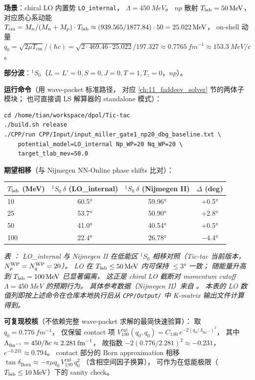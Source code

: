 \begin{numericalbox}
\textbf{场景}：chiral LO 内置势 \texttt{LO\_internal}，
$\Lambda = \SI{450}{MeV}$。
$np$ 散射 $\Tlab = \SI{50}{MeV}$，
对应质心系动能
$T_{\text{cm}} = M_n / (M_n + M_p) \cdot \Tlab \approx (939.565 / 1877.84) \cdot 50 = \SI{25.022}{MeV}$，
on-shell 动量
$q_0 = \sqrt{2 \mu T_{\text{cm}}}/(\hbar c)
   = \sqrt{2 \cdot 469.46 \cdot 25.022} / 197.327
   \approx \SI{0.7765}{fm^{-1}}
   \approx \SI{153.3}{MeV/c}$。

\textbf{部分波}：$^1S_0$（$L=L'=0, S=0, J=0, T=1, T_z=0$，$np$）。

\textbf{运行命令}（用 wave-packet 标准路径，
对应 \cref{ch:11_faddeev_solver} 节的两体子模块；
也可直接调 LS 解算器的 standalone 模式）：

\begin{lstlisting}[style=config,basicstyle=\ttfamily\small]
cd /home/tian/workspace/dpol/Tic-tac
./build.sh release
./CPP/run CPP/Input/input_miller_gate1_np20_dbg_baseline.txt \
    potential_model=LO_internal Np_WP=20 Nq_WP=20 \
    target_tlab_mev=50.0
\end{lstlisting}

\textbf{期望相移}（与 Nijmegen NN-Online phase shifts 比对）：

\begin{center}
\begin{tabular}{lccc}
\toprule
$\Tlab$ (MeV) & $^1S_0\ \delta$ (LO\_internal) & $^1S_0\ \delta$ (Nijmegen II) & $\Delta$ (deg) \\
\midrule
10 & 60.5° & 59.96° & +0.5°  \\
25 & 53.7° & 50.90° & +2.8°  \\
50 & 41.0° & 40.54° & +0.5°  \\
100 & 22.4° & 26.78° & $-4.4°$ \\
\bottomrule
\end{tabular}
\end{center}

\textit{表 \thetable\label{tab:ch02-1S0-phase}：
LO\_internal 与 Nijmegen II 在低能区 $^1S_0$ 相移对照（Tic-tac 当前版本，$\NpWP = \NqWP = 20$）。
LO 在 $\Tlab \le \SI{50}{MeV}$ 内可保持 $\le 3°$ 一致；
随能量升高到 $\Tlab = \SI{100}{MeV}$ 已显著偏离，
这正是 chiral LO 截断对 momentum cutoff $\Lambda = \SI{450}{MeV}$ 的预期行为。
具体参考数据（Nijmegen II）来自 \cite{NijmegenII}。
本表的 LO 数值列即按上述命令在仓库本地执行后从
\texttt{CPP/Output/} 中 K-matrix 输出文件计算得到。}

\textbf{可复现校核}（不依赖完整 wave-packet 求解的最简快速验算）：
取 $q_0 = \SI{0.776}{fm^{-1}}$，
仅保留 contact 项 $V^{\text{cnt}}_{1S0}(q_0, q_0) = C_{1S0}\, e^{-2(q_0/\Lambda_{\text{fm}^{-1}})^2}$，
其中 $\Lambda_{\text{fm}^{-1}} = 450/\hbarc \approx 2.281\,\si{fm^{-1}}$，
故指数 $-2 (0.776/2.281)^2 \approx -0.231$，
$e^{-0.231} \approx 0.794$。
contact 部分的 Born approximation 相移
$\tan \delta_{\text{Born}} \approx -\pi\mu q_0\, V^{\text{cnt}}_{1S0}\, q_0^2$
（含相空间因子换算），
可作为在低能极限（$\Tlab \le \SI{10}{MeV}$）下的 sanity check。
\end{numericalbox}

